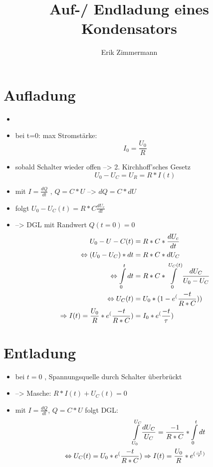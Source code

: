 \documentclass[10pt,a4paper]{article}
\author{Erik Zimmermann}
\title{Auf-/ Endladung eines Kondensators}
\begin{document}
\maketitle
\newpage

\tableofcontents

\newpage
\section{Aufladung}
\begin{itemize}
\item <Bild Schaltung>
\item bei t=0: max Stromstärke:
\begin{equation}
I_0= \frac{U_0}{R}
\end{equation}
\item sobald Schalter wieder offen --> 2. Kirchhoff'sches Gesetz
\begin{equation}
U_0 - U_C=U_R= R*I(t)
\end{equation}
\item mit $I= \frac{dQ}{dt}$ , $Q=C*U$ --> $dQ=C*dU$
\item folgt $U_0-U_C(t)=R*C \frac{dU_c}{dt}$
\item --> DGL mit Randwert $Q(t=0)=0$ 
\begin{align}
U_0-U-C(t)&=R*C* \frac{dU_c}{dt}\notag \\
\Leftrightarrow (U_0-U_C)*dt&=R*C*dU_C \notag \\
\Leftrightarrow \int^{t}_{0}\limits {dt}&=R*C* \int^{U_C(t)}_{0}\limits {\frac{dU_C}{U_0-U_C} } \notag \\
\Leftrightarrow U_C(t)&=U_0*(1-e^(\frac{-t}{R*C}))\notag \\ 
\Rightarrow I(t)= \frac{U_0}{R}*e^(\frac{-t}{R*C})&=I_0*e^(\frac{-t}{\tau})
\end{align}
\end{itemize}

\section{Entladung}
\begin{itemize}
\item bei $t=0$ , Spannungsquelle durch Schalter überbrückt
\item --> Masche: $R*I(t)+U_C(t)=0$
\item mit $I= \frac{dQ}{dt}$, $Q=C*U$ folgt DGL:
\begin{align}
\int^{U_C}_{U_0}\limits {\frac{dU_C}{U_C}}=\frac{-1}{R*C} * \int^{t}_{0}\limits {dt } \notag \\
\Leftrightarrow U_C(t)= U_0* e^(\frac{-t}{R*C})
\Rightarrow I(t)=\frac{U_0}{R}*e^{(\frac{-t}{\tau})}
\end{align}
\end{itemize}
\end{document}
